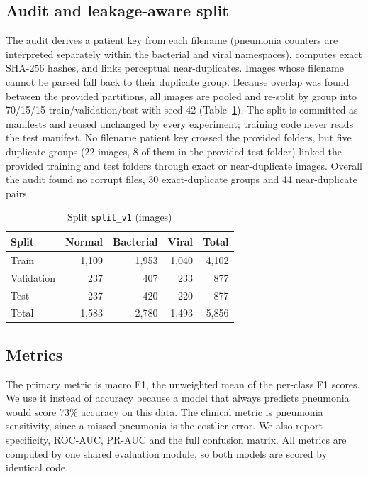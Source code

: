 \documentclass[conference]{IEEEtran}
\begin{document}
\subsection{Audit and leakage-aware split}
The audit derives a patient key from each filename (pneumonia counters are interpreted separately within the bacterial and viral namespaces), computes exact SHA-256 hashes, and links perceptual near-duplicates. Images whose filename cannot be parsed fall back to their duplicate group. Because overlap was found between the provided partitions, all images are pooled and re-split by group into 70/15/15 train/validation/test with seed 42 (Table~\ref{tab:split}). The split is committed as manifests and reused unchanged by every experiment; training code never reads the test manifest. No filename patient key crossed the provided folders, but five duplicate groups (22 images, 8 of them in the provided test folder) linked the provided training and test folders through exact or near-duplicate images. Overall the audit found no corrupt files, 30 exact-duplicate groups and 44 near-duplicate pairs.

\begin{table}[t]
\caption{Split \texttt{split\_v1} (images)}
\label{tab:split}
\centering
\begin{tabular}{@{}lrrrr@{}}
\toprule
Split & Normal & Bacterial & Viral & Total \\
\midrule
Train & 1,109 & 1,953 & 1,040 & 4,102 \\
Validation & 237 & 407 & 233 & 877 \\
Test & 237 & 420 & 220 & 877 \\
\midrule
Total & 1,583 & 2,780 & 1,493 & 5,856 \\
\bottomrule
\end{tabular}
\end{table}

\subsection{Metrics}
The primary metric is macro F1, the unweighted mean of the per-class F1 scores. We use it instead of accuracy because a model that always predicts pneumonia would score 73\% accuracy on this data. The clinical metric is pneumonia sensitivity, since a missed pneumonia is the costlier error. We also report specificity, ROC-AUC, PR-AUC and the full confusion matrix. All metrics are computed by one shared evaluation module, so both models are scored by identical code.
\end{document}
